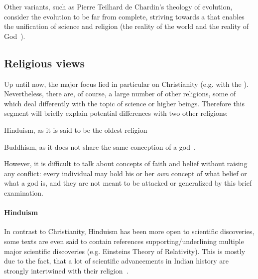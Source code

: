 Other variants, such as Pierre Teilhard de Chardin's theology of evolution, consider the evolution to be far from complete, striving towards a  that enables the unification of science and religion (the reality of the world and the reality of God~\cite{teilhard1971christianity}).


\subsection{Religious views}

Up until now, the major focus lied in particular on Christianity (e.g. with the ).
Nevertheless, there are, of course, a large number of other religions, some of which deal differently with the topic of science or higher beings.
Therefore this segment will briefly explain potential differences with two other religions: \begin{inlist}
    \item Hinduism, as it is said to be the oldest religion~\cite[p.~732]{Kurien2006}
    \item Buddhism, as it does not share the same conception of a god~\cite{roloff2011buddhismus}.
\end{inlist}

However, it is difficult to talk about concepts of faith and belief without raising any conflict: every individual may hold his or her \emph{own} concept of what belief or what a god is, and they are not meant to be attacked or generalized by this brief examination.

\paragraph{Hinduism} In contrast to Christianity, Hinduism has been more open to scientific discoveries, some texts are even said to contain references supporting/underlining multiple major scientific discoveries (e.g. Einsteins Theory of Relativity).
This is mostly due to the fact, that a lot of scientific advancements in Indian history are strongly intertwined with their religion~\cite{mitcham2005encyclopedia}.

